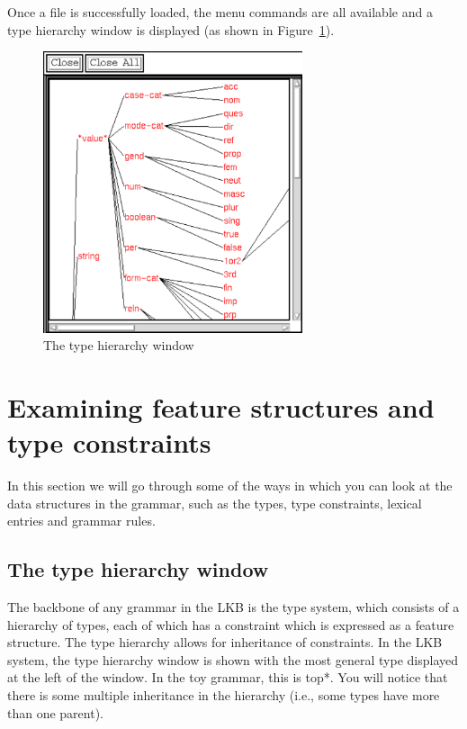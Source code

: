 \documentclass[12pt]{report}
\begin{document}
Once a file is successfully loaded, the menu commands are all available
and a type hierarchy window is displayed (as shown in Figure~\ref{typehier}).
\begin{figure}
\includegraphics[width=3in]{figs/typehier}
\caption{The type hierarchy window}
\label{typehier}
\end{figure}


\section{Examining feature structures and type constraints}

In this section we will go through some of the ways in which
you can look at the data structures in the grammar, such as the types,
type constraints,
lexical entries and grammar rules.

\subsection{The type hierarchy window}
The backbone of any grammar in the LKB is the type system,
which consists of a hierarchy of types, each of which has a
constraint which is expressed as a feature structure.
The type hierarchy allows for inheritance of constraints.
In the LKB system, the type hierarchy window is shown 
with the most
general type displayed at the left of the window.  In the toy grammar, 
this is {\type *top*}.  
You will notice that there is some multiple inheritance in the hierarchy
(i.e., some types have more than one parent).
\end{document}
